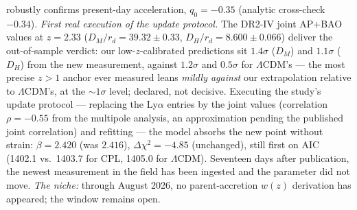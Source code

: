 \documentclass[11pt]{article}
\begin{document}
robustly confirms present-day acceleration, $q_0 = -0.35$ (analytic cross-check $-0.34$). \emph{First real execution of the update protocol.} The DR2-IV joint AP+BAO values at $z = 2.33$ ($D_M/r_d = 39.32 \pm 0.33$, $D_H/r_d = 8.600 \pm 0.066$) deliver the out-of-sample verdict: our low-$z$-calibrated predictions sit $1.4\sigma$ ($D_M$) and $1.1\sigma$ ($D_H$) from the new measurement, against $1.2\sigma$ and $0.5\sigma$ for $\Lambda$CDM's --- the most precise $z>1$ anchor ever measured leans \emph{mildly against} our extrapolation relative to $\Lambda$CDM's, at the $\sim1\sigma$ level; declared, not decisive. Executing the study's update protocol --- replacing the Ly$\alpha$ entries by the joint values (correlation $\rho = -0.55$ from the multipole analysis, an approximation pending the published joint correlation) and refitting --- the model absorbs the new point without strain: $\beta = 2.420$ (was $2.416$), $\Delta\chi^2 = -4.85$ (unchanged), still first on AIC (1402.1 vs.\ 1403.7 for CPL, 1405.0 for $\Lambda$CDM). Seventeen days after publication, the newest measurement in the field has been ingested and the parameter did not move. \emph{The niche:} through August 2026, no parent-accretion $w(z)$ derivation has appeared; the window remains open.
\end{document}
